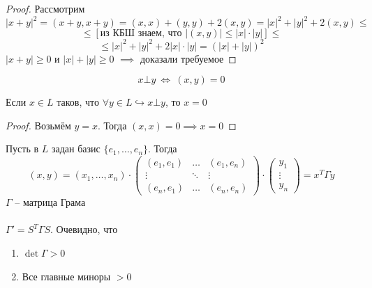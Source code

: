 \documentclass[11pt]{article}
\begin{document}
\begin{proof}
  Рассмотрим \[\left\lvert x + y \right\rvert^2 = (x + y, x + y) = 
  (x, x) + (y, y) + 2(x, y) = \left\lvert x \right\rvert^2 + 
  \left\lvert y \right\rvert^2 + 2(x, y) \leq\]
  \[\leq [\text{из КБШ знаем, что } \left\lvert (x, y) \right\rvert 
  \leq \left\lvert x \right\rvert \cdot \left\lvert y \right\rvert] \leq\] 
  \[\leq \left\lvert x \right\rvert^2 + \left\lvert y \right\rvert^2 
  + 2\left\lvert x \right\rvert \cdot \left\lvert y \right\rvert = 
  (\left\lvert x \right\rvert + \left\lvert y \right\rvert)^2\]
  $\left\lvert x + y \right\rvert \geq 0$ и 
  $\left\lvert x \right\rvert + \left\lvert y \right\rvert \geq 0$
  $\implies$ доказали требуемое
\end{proof}

\begin{definition}
  \[x \bot y \ \Longleftrightarrow \ (x, y) = 0\]
\end{definition}

\begin{lemma}
  Если $x \in L$ таков, что $\forall y \in L \hookrightarrow x 
  \bot y$, то $x = 0$
\end{lemma}

\begin{proof}
  Возьмём $y = x$. Тогда $(x, x) = 0 \implies x = 0$
\end{proof}

\begin{definition}
  Пусть в $L$ задан базис $\{e_1, \ldots, e_n\}$. Тогда 
  \[(x, y) = (x_1, \ldots, x_n) \cdot
  \begin{pmatrix}
    (e_1, e_1) & \dots & (e_1, e_n) \\
    \vdots & \ddots & \vdots \\
    (e_n, e_1) & \dots & (e_n, e_n)
  \end{pmatrix} \cdot
  \begin{pmatrix}
    y_1 \\
    \vdots \\
    y_n
  \end{pmatrix} = x^T \Gamma y\]
  $\Gamma$ -- матрица Грама \\ \\
  $\Gamma' = S^T \Gamma S$. Очевидно, что 
  \begin{enumerate}
    \item $\det \Gamma > 0$
    \item Все главные миноры $> 0$
  \end{enumerate}
\end{definition}
\end{document}
